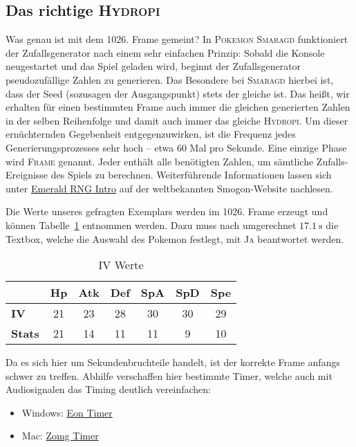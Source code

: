 \documentclass[11pt,a4paper,titlepage]{article}
\begin{document}
\subsection{Das richtige \textsc{Hydropi}}
\label{sec:correct_mudkip}
Was genau ist mit dem 1026. Frame gemeint? In \textsc{Pokemon Smaragd} funktioniert der Zufallsgenerator nach einem sehr einfachen Prinzip: Sobald die Konsole neugestartet und das Spiel geladen wird, beginnt der Zufallsgenerator pseudozufällige Zahlen zu generieren. Das Besondere bei \textsc{Smaragd} hierbei ist, dass der Seed (sozusagen der Ausgangspunkt) stets der gleiche ist. Das heißt, wir erhalten für einen bestimmten Frame auch immer die gleichen generierten Zahlen in der selben Reihenfolge und damit auch immer das gleiche \textsc{Hydropi}. Um dieser ernüchternden Gegebenheit entgegenzuwirken, ist die Frequenz jedes Generierungsprozesses sehr hoch -- etwa 60 Mal pro Sekunde. Eine einzige Phase wird \textsc{Frame} genannt. Jeder enthält alle benötigten Zahlen, um sämtliche Zufalls-Ereignisse des Spiels zu berechnen. Weiterführende Informationen lassen sich unter \href{http://www.smogon.com/ingame/rng/emerald_rng_intro}{Emerald RNG Intro} auf der weltbekannten Smogon-Website nachlesen.


Die Werte unseres gefragten Exemplars werden im 1026. Frame erzeugt und können Tabelle~\ref{tab:mudkip_ivs} entnommen werden. Dazu muss nach umgerechnet $17.1~\si{\second}$ die Textbox, welche die Auswahl des Pokemon festlegt, mit \textsc{Ja} beantwortet werden.

\begin{table}[htb]
	\caption{IV Werte}
	\label{tab:mudkip_ivs}
	\centering
	\begin{tabular}{lcccccc}
		\toprule
		&\textbf{Hp}	&\textbf{Atk}&\textbf{Def}&\textbf{SpA}&\textbf{SpD}	&\textbf{Spe} \\
		\midrule
			\textbf{IV}		&21		&23		&28		&30		&30		&29		\\
			\textbf{Stats}	&21		&14		&11		&11		&9		&10		\\
		\bottomrule
	\end{tabular}
\end{table}
 
Da es sich hier um Sekundenbruchteile handelt, ist der korrekte Frame anfangs schwer zu treffen. Abhilfe verschaffen hier bestimmte Timer, welche auch mit Audiosignalen das Timing deutlich vereinfachen:

\begin{itemize}
\item Windows: \href{https://bitbucket.org/ToastPlusOne/eontimer/downloads/EonTimer-1_6.1.zip}{Eon Timer}
\item Mac: \href{https://www.dropbox.com/s/aurp9y34j5rdbhv/ZomgTimer-V2_21.jar#}{Zomg Timer}
\end{itemize}
\end{document}
